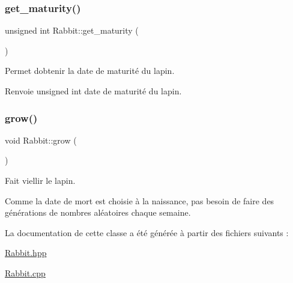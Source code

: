 \subsubsection{\texorpdfstring{get\+\_\+maturity()}{get\_maturity()}}
{\footnotesize\ttfamily unsigned int Rabbit\+::get\+\_\+maturity (\begin{DoxyParamCaption}{ }\end{DoxyParamCaption})}



Permet d\textquotesingle{}obtenir la date de maturité du lapin. 

\begin{DoxyReturn}{Renvoie}
unsigned int date de maturité du lapin. 
\end{DoxyReturn}
\mbox{\label{classRabbit_a404af8877c99ddc98108d88c8e466013}} 
\subsubsection{\texorpdfstring{grow()}{grow()}}
{\footnotesize\ttfamily void Rabbit\+::grow (\begin{DoxyParamCaption}{ }\end{DoxyParamCaption})}



Fait viellir le lapin. 

Comme la date de mort est choisie à la naissance, pas besoin de faire des générations de nombres aléatoires chaque semaine. 

La documentation de cette classe a été générée à partir des fichiers suivants \+:\begin{DoxyCompactItemize}
\item 
\hyperlink{Rabbit_8hpp}{Rabbit.\+hpp}\item 
\hyperlink{Rabbit_8cpp}{Rabbit.\+cpp}\end{DoxyCompactItemize}
